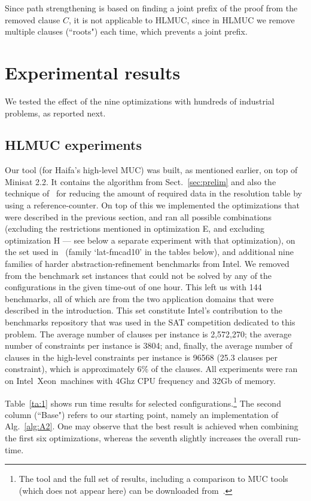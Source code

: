 \documentclass[twoside,11pt]{article}
\begin{document}
Since path strengthening is based on finding a joint prefix of the proof from
the removed clause $C$, it is not applicable to HLMUC, since in HLMUC we remove
multiple clauses (``roots") each time, which prevents a joint prefix.


\section{Experimental results}
We tested the effect of the nine optimizations with hundreds of industrial problems, as reported next.


\subsection{HLMUC experiments}
\label{sec:experiments} Our tool  (for Haifa's high-level MUC)
was built, as mentioned earlier, on top of Minisat 2.2. It contains the
algorithm from Sect.~\ref{sec:prelim} and also the technique of~\cite{SY07}
for reducing the amount of required data in the resolution table by using a
reference-counter.
On top of this we implemented the optimizations that were
described in the previous section, and ran all possible combinations
(excluding the restrictions mentioned in optimization E, and excluding optimization H --- see below a separate experiment with that optimization), on the set used in~\cite{N10} (family `lat-fmcad10' in the tables below), and additional nine families of harder abstraction-refinement benchmarks from Intel.
We removed from the benchmark set instances that could not be solved by any of
the configurations in the given time-out of one hour. This left us with 144
benchmarks, all of which are from the two application domains that were
described in the introduction. This set constitute Intel's contribution to
the benchmarks repository that was used in the SAT competition
dedicated to this problem. The average number of clauses per instance is
2,572,270; the average number of constraints per instance is 3804; and,
finally, the average number of clauses in the high-level constraints per instance is 96568
(25.3 clauses per constraint), which is approximately 6\% of the clauses. All
experiments were ran on Intel\textregistered\ Xeon\textregistered\ machines
with 4Ghz CPU frequency and 32Gb of memory.


Table~\ref{ta:1} shows run time results for selected
configurations.\footnote{The tool and the full set of results, including a
comparison to MUC tools (which does not appear here) can be downloaded
from~\cite{RS11-URL}.} The second column (``Base") refers to our starting
point, namely an implementation of Alg.~\ref{alg:A2}. One may observe that the best result is achieved when combining the first six optimizations, whereas the seventh slightly increases the overall run-time.
\end{document}
